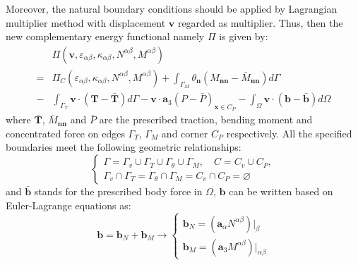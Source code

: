 Moreover, the natural boundary conditions should be applied by Lagrangian multiplier method with displacement $\boldsymbol v$ regarded as multiplier. Thus, then the new complementary energy functional namely $\Pi$ is given by:
\begin{equation} \label{functional}
\begin{split}
&\Pi(\boldsymbol v, \varepsilon_{\alpha\beta},\kappa_{\alpha\beta},N^{\alpha\beta},M^{\alpha\beta}) \\
=&\Pi_C(\varepsilon_{\alpha\beta},\kappa_{\alpha\beta},N^{\alpha\beta},M^{\alpha\beta})
+ \int_{\Gamma_M} \theta_{\boldsymbol n} (M_{\boldsymbol{nn}} - \bar M_{\boldsymbol{nn}}) d\Gamma \\
- &\int_{\Gamma_T} \boldsymbol v \cdot (\boldsymbol T - \bar{\boldsymbol T})d\Gamma - \boldsymbol v \cdot \boldsymbol a_3 (P - \bar{P})_{\boldsymbol x \in C_P}
- \int_\Omega \boldsymbol v \cdot (\boldsymbol b - \bar{\boldsymbol b}) d\Omega 
\end{split}
\end{equation}
where $\bar{\boldsymbol T}$, $\bar M_{\boldsymbol{nn}}$ and $\bar P$ are the prescribed traction, bending moment and concentrated force on edges $\Gamma_T$, $\Gamma_M$ and corner $C_P$ respectively. All the specified boundaries meet the following geometric relationships:
\begin{equation}\label{geo}
\begin{cases}
\Gamma=\Gamma_v \cup \Gamma_T \cup \Gamma_\theta \cup \Gamma_M, \quad C = C_v \cup C_P, \\
\Gamma_v \cap \Gamma_T = \Gamma_\theta \cap \Gamma_M = C_v \cap C_P = \varnothing
\end{cases}
\end{equation}
and $\bar{\boldsymbol b}$ stands for the prescribed body force in $\Omega$, $\boldsymbol b$ can be written based on Euler-Lagrange equations \cite{benzaken2021} as:
\begin{equation}
\boldsymbol b = \boldsymbol b_N + \boldsymbol b_M \rightarrow
\begin{cases}
\boldsymbol b_N = (\boldsymbol a_\alpha N^{\alpha\beta})\vert_\beta \\
\boldsymbol b_M = (\boldsymbol a_3 M^{\alpha\beta})\vert_{\alpha\beta}
\end{cases}
\end{equation}

